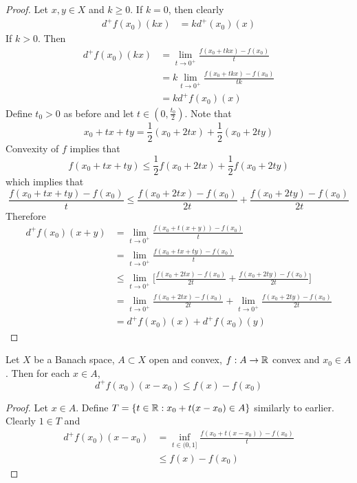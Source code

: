 \documentclass{book}
\begin{document}
	\begin{proof}
	Let $x,y \in X$ and $k \geq 0$. If $k = 0$, then clearly
	\begin{align*}
	d^+f(x_0)(kx)
	&= k d^+(x_0)(x)
	\end{align*}
	If $k >0$. Then 
	\begin{align*}
	d^+f(x_0)(kx)
	&= \lim_{t \rightarrow 0^+} \frac{f(x_0 + tkx) - f(x_0)}{t} \\
	&= k\lim_{t \rightarrow 0^+} \frac{f(x_0 + tkx) - f(x_0)}{tk}\\
	&= kd^+f(x_0)(x)
	\end{align*}
	Define $t_0 >0$ as before and let $t \in (0, \frac{t_0}{2})$. Note that $$x_0 + tx + ty = \frac{1}{2}(x_0 + 2tx) + \frac{1}{2}(x_0 + 2ty)$$ 
	Convexity of $f$ implies that $$f(x_0 + tx + ty) \leq \frac{1}{2}f(x_0 + 2tx) + \frac{1}{2}f(x_0 + 2ty)$$
	which implies that $$\frac{f(x_0 + tx + ty) - f(x_0)}{t} \leq \frac{f(x_0 + 2tx) - f(x_0)}{2t} + \frac{f(x_0 + 2ty) - f(x_0)}{2t}$$
	Therefore 
	\begin{align*}
	d^+f(x_0)(x+y) 
	&= \lim_{t \rightarrow 0^+} \frac{f(x_0 + t(x + y)) - f(x_0)}{t} \\
	&= \lim_{t \rightarrow 0^+} \frac{f(x_0 + tx + ty) - f(x_0)}{t} \\
	& \leq \lim_{t \rightarrow 0^+} \bigg[ \frac{f(x_0 + 2tx) - f(x_0)}{2t} + \frac{f(x_0 + 2ty) - f(x_0)}{2t} \bigg ] \\
	&= \lim_{t \rightarrow 0^+}  \frac{f(x_0 + 2tx) - f(x_0)}{2t} + \lim_{t \rightarrow 0^+} \frac{f(x_0 + 2ty) - f(x_0)}{2t} \\
	&= d^+f(x_0)(x) + d^+f(x_0)(y) 
	\end{align*}
	\end{proof}
	
	\begin{ex} \lex{}
	Let $X$ be a Banach space, $A \subset X$ open and convex, $f:A \rightarrow \mathbb{R}$ convex and $x_0 \in A$. Then for each $x \in A$, $$d^+f(x_0)(x-x_0) \leq f(x) - f(x_0)$$
	\end{ex}	
	
	\begin{proof}
	Let $x \in A$. Define $T = \{t \in \mathbb{R}: x_0 + t(x-x_0) \in A\}$ similarly to earlier. Clearly $1 \in T$ and  
	\begin{align*}
	d^+f(x_0)(x - x_0) 
	&= \inf_{t \in (0,1]} \frac{f(x_0 + t(x-x_0)) - f(x_0)}{t} \\
	& \leq f(x) - f(x_0)
	\end{align*}
	\end{proof}
	
\end{document}
